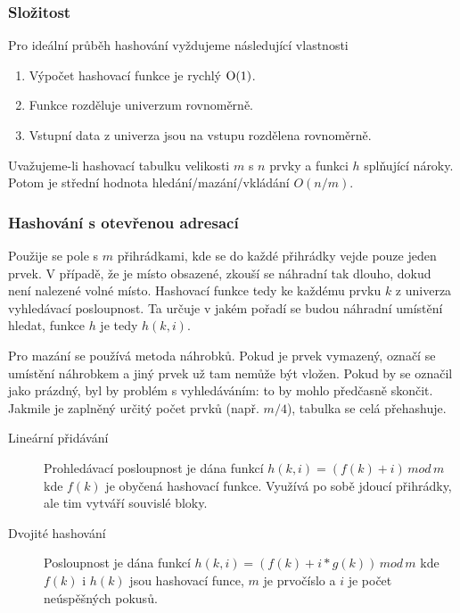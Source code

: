       \subsubsection{Složitost}
        Pro ideální průběh hashování vyždujeme následující vlastnosti
        \begin{enumerate}
          \item Výpočet hashovací funkce je rychlý $\textrm O(1)$.
          \item Funkce rozděluje univerzum rovnoměrně.
          \item Vstupní data z univerza jsou na vstupu rozdělena rovnoměrně.
        \end{enumerate}

        Uvažujeme-li hashovací tabulku velikosti $m$ s $n$ prvky a funkci $h$ splňující nároky.
        Potom je střední hodnota hledání/mazání/vkládání $O(n/m)$.

      \subsubsection{Hashování s otevřenou adresací}
        Použije se pole s $m$ přihrádkami, kde se do každé přihrádky vejde pouze jeden prvek.
        V případě, že je místo obsazené, zkouší se náhradní tak dlouho, dokud není nalezené volné místo.
        Hashovací funkce tedy ke každému prvku $k$ z univerza vyhledávací posloupnost.
        Ta určuje v jakém pořadí se budou náhradní umístění hledat, funkce $h$ je tedy $h(k, i)$.

          Pro mazání se používá metoda náhrobků. Pokud je prvek vymazený, označí se umístění náhrobkem a jiný prvek už tam nemůže být vložen.
          Pokud by se označil jako prázdný, byl by problém s vyhledáváním: to by mohlo předčasně skončit.
          Jakmile je zaplněný určitý počet prvků (např. $m/4$), tabulka se celá přehashuje.

          \begin{description}
            \item[Lineární přidávání] Prohledávací posloupnost je dána funkcí $h(k, i) = (f(k) + i) \, mod \, m$ kde $f(k)$ je obyčená hashovací funkce. Využívá po sobě jdoucí přihrádky, ale tim vytváří souvislé bloky.
            \item[Dvojité hashování] Posloupnost je dána funkcí $h(k, i) = (f(k) + i * g(k)) \, mod \, m$ kde $f(k)$ i $h(k)$ jsou hashovací funce, $m$ je prvočíslo a $i$ je počet neúspěšných pokusů.
          \end{description}
